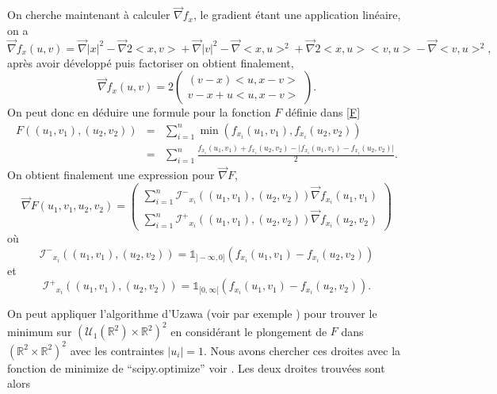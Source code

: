 \documentclass[a4paper,10pt]{article}
\begin{document}
	On cherche maintenant à calculer $\overrightarrow{\nabla} f_x$, le gradient étant une application linéaire, on a  
	\[\overrightarrow{\nabla} f_x (u,v)= \overrightarrow{\nabla}\big|x\big|^2-\overrightarrow{\nabla}2\big<x,v\big>+\overrightarrow{\nabla}\big|v\big|^2 -\overrightarrow{\nabla}\big<x, u\big>^2+ \overrightarrow{\nabla}2\big<x, u\big>\big<v, u\big>- \overrightarrow{\nabla}\big<v, u\big>^2,\]
	après avoir développé puis factoriser on obtient finalement, 
	\begin{equation}
		\overrightarrow{\nabla} f_x (u,v)=2
		\begin{pmatrix}
			(v-x)\big<u,x-v\big>\\
			v-x+u\big<u,x-v\big>
		\end{pmatrix}.
	\end{equation}
	On peut donc en déduire une formule pour la fonction $F$ définie dans \eqref{F}
	\begin{equation}
		\begin{array}{ccc}
			F((u_1,v_1), (u_2,v_2))&=& \sum_{i=1}^{n}\min (f_{x_i}(u_1,v_1) ,f_{x_i}(u_2,v_2) )\\
			&=& \sum_{i=1}^{n} \frac{f_{x_i}(u_1,v_1)+f_{x_i}(u_2,v_2) -\big|f_{x_i}(u_1,v_1)- f_{x_i}(u_2,v_2) \big| }{2}.
		\end{array}
	\end{equation}
	On obtient finalement une expression pour $\overrightarrow{\nabla} F$, 
	\begin{equation}
		\overrightarrow{\nabla} F(u_1,v_1, u_2,v_2)=
		\begin{pmatrix}
			\sum_{i=1}^{n}\mathcal{I^{-}}_{x_i}((u_1,v_1),(u_2,v_2))\overrightarrow{\nabla}f_{x_i} (u_1,v_1)\\
			\sum_{i=1}^{n}\mathcal{I^{+}}_{x_i}((u_1,v_1),(u_2,v_2))\overrightarrow{\nabla}f_{x_i} (u_2,v_2)
		\end{pmatrix}
	\end{equation}
	où \[\mathcal{I^{-}}_{x_i}((u_1,v_1),(u_2,v_2))=\mathds{1}_{]-\infty,0]}(f_{x_i}(u_1,v_1)- f_{x_i}(u_2,v_2))\] et \[\mathcal{I^{+}}_{x_i}((u_1,v_1),(u_2,v_2))=\mathds{1}_{[0,\infty[}(f_{x_i}(u_1,v_1)- f_{x_i}(u_2,v_2)).\]
	
	On peut appliquer l'algorithme d'Uzawa (voir par exemple \cite{boyd2004convex}) pour trouver le minimum sur  $(\mathcal{U}_1(\mathbb{R}^2)\times\mathbb{R}^2)^2$ en considérant le plongement de $F$ dans  $(\mathbb{R}^2\times\mathbb{R}^2)^2$ avec les contraintes $|u_i|=1$. Nous avons chercher ces droites avec la fonction de minimize de ``scipy.optimize'' voir \cite{scipy}. Les deux droites trouvées sont alors 
	
\end{document}

